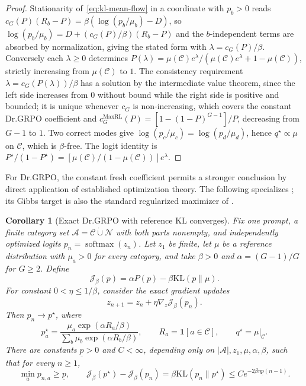 \documentclass{article}
\newcommand{\enforcehalffinalproseline}{%
  \setlength{\parfillskip}{0pt plus .20\linewidth}}
\newcommand{\1}{\mathbf 1}
\newtheorem{corollary}[lemma]{Corollary}
\theoremstyle{remark}
\theoremstyle{definition}
\theoremstyle{plain}
\begin{document}
\begin{proof}
\enforcehalffinalproseline
Stationarity of~\eqref{eq:kl-mean-flow} in a coordinate with $p_b>0$ reads
$c_G(P)(R_b-P)=\beta(\log(p_b/\mu_b)-D)$, so
$\log(p_b/\mu_b)=D+(c_G(P)/\beta)(R_b-P)$ and the $b$-independent terms are
absorbed by normalization, giving the stated form with $\lambda=c_G(P)/\beta$.
Conversely each $\lambda\ge0$ determines
$P(\lambda)=\mu(\mathcal C)e^\lambda/(\mu(\mathcal C)e^\lambda+1-\mu(\mathcal C))$,
strictly increasing from $\mu(\mathcal C)$ to $1$. The consistency requirement
$\lambda=c_G(P(\lambda))/\beta$ has a solution by the intermediate value
theorem, since the left side increases from $0$ without bound while the right
side is positive and bounded; it is unique whenever $c_G$ is non-increasing,
which covers the constant Dr.GRPO coefficient and
$c_G^{\mathrm{MaxRL}}(P)=[1-(1-P)^{G-1}]/P$, decreasing from $G-1$ to $1$.
Two correct modes give $\log(p_c/\mu_c)=\log(p_d/\mu_d)$, hence
$q^\star\propto\mu$ on $\mathcal C$, which is $\beta$-free. The logit identity
is $P^\star/(1-P^\star)=[\mu(\mathcal C)/(1-\mu(\mathcal C))]e^\lambda$.
\end{proof}

For Dr.GRPO, the constant fresh coefficient permits a stronger conclusion
by direct application of established optimization theory. The following
specializes \citet[Theorem~5 and Lemma~13]{mei2020softmaxpg}; its Gibbs
target is also the standard regularized maximizer of
\citet[Proposition~1]{geist2019regmdp}.

\begin{corollary}[Exact Dr.GRPO with reference KL converges]
\enforcehalffinalproseline
\label{cor:kl-dr-mei-convergence}
Fix one prompt, a finite category set
$\mathcal A=\mathcal C\mathbin{\dot\cup}\mathcal N$ with both parts
nonempty, and independently optimized logits $p_n=\operatorname{softmax}(z_n)$.
Let $z_1$ be finite, let $\mu$ be a reference distribution with
$\mu_a>0$ for every category, and take $\beta>0$ and
$\alpha=(G-1)/G$ for $G\ge2$. Define
\[
 \mathcal J_\beta(p)=\alpha P(p)-\beta\mathrm{KL}(p\|\mu).
\]
For constant $0<\eta\le1/\beta$, consider the exact gradient updates
\begin{equation}
 z_{n+1}=z_n+\eta\nabla_z\mathcal J_\beta(p_n).
 \label{eq:kl-dr-mei-update}
\end{equation}
Then $p_n\to p^\star$, where
\[
 p^\star_a=
 \frac{\mu_a\exp(\alpha R_a/\beta)}
      {\sum_b\mu_b\exp(\alpha R_b/\beta)},
 \qquad R_a=\1[a\in\mathcal C],
 \qquad q^\star=\mu|_{\mathcal C}.
\]
There are constants $\underline p>0$ and $C<\infty$, depending only on
$|\mathcal A|,z_1,\mu,\alpha,\beta$, such that for every $n\ge1$,
\begin{equation}
 \min_a p_{n,a}\ge\underline p,
 \qquad
 \mathcal J_\beta(p^\star)-\mathcal J_\beta(p_n)
 =\beta\mathrm{KL}(p_n\|p^\star)
 \le C e^{-2\beta\eta\underline p(n-1)}.
 \label{eq:kl-dr-mei-rate}
\end{equation}
\end{corollary}
\end{document}
